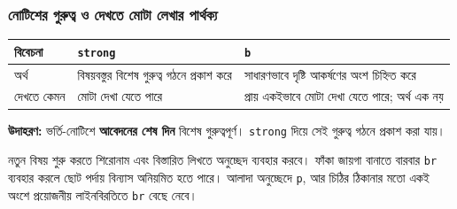 \subsubsection{নোটিশের গুরুত্ব ও দেখতে মোটা লেখার পার্থক্য}
\begin{flushleft}\small
\begin{tabularx}{\linewidth}{|p{26mm}|X|X|}\hline
\textbf{বিবেচনা} & \textbf{\texttt{strong}} & \textbf{\texttt{b}}\\\hline
অর্থ & বিষয়বস্তুর বিশেষ গুরুত্ব গঠনে প্রকাশ করে & সাধারণভাবে দৃষ্টি আকর্ষণের অংশ চিহ্নিত করে\\\hline
দেখতে কেমন & মোটা দেখা যেতে পারে & প্রায় একইভাবে মোটা দেখা যেতে পারে; অর্থ এক নয়\\\hline
\end{tabularx}
\end{flushleft}
\textbf{উদাহরণ:} ভর্তি-নোটিশে \textbf{আবেদনের শেষ দিন} বিশেষ গুরুত্বপূর্ণ। \texttt{strong} দিয়ে সেই গুরুত্ব গঠনে প্রকাশ করা যায়।

নতুন বিষয় শুরু করতে শিরোনাম এবং বিস্তারিত লিখতে অনুচ্ছেদ ব্যবহার করবে। ফাঁকা জায়গা বানাতে বারবার \texttt{br} ব্যবহার করলে ছোট পর্দায় বিন্যাস অনিয়মিত হতে পারে। আলাদা অনুচ্ছেদে \texttt{p}, আর চিঠির ঠিকানার মতো একই অংশে প্রয়োজনীয় লাইনবিরতিতে \texttt{br} বেছে নেবে।
